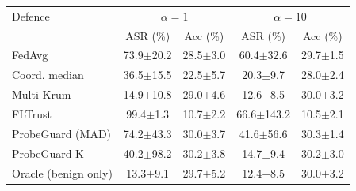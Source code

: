 \begin{tabular}{@{}lcccc@{}}
\toprule
Defence & \multicolumn{2}{c}{$\alpha=1$} & \multicolumn{2}{c}{$\alpha=10$}\\
 & ASR (\%) & Acc (\%) & ASR (\%) & Acc (\%)\\
\midrule
FedAvg & 73.9$\pm$20.2 & 28.5$\pm$3.0 & 60.4$\pm$32.6 & 29.7$\pm$1.5\\
Coord. median & 36.5$\pm$15.5 & 22.5$\pm$5.7 & 20.3$\pm$9.7 & 28.0$\pm$2.4\\
Multi-Krum & 14.9$\pm$10.8 & 29.0$\pm$4.6 & 12.6$\pm$8.5 & 30.0$\pm$3.2\\
FLTrust & 99.4$\pm$1.3 & 10.7$\pm$2.2 & 66.6$\pm$143.2 & 10.5$\pm$2.1\\
ProbeGuard (MAD) & 74.2$\pm$43.3 & 30.0$\pm$3.7 & 41.6$\pm$56.6 & 30.3$\pm$1.4\\
ProbeGuard-K & 40.2$\pm$98.2 & 30.2$\pm$3.8 & 14.7$\pm$9.4 & 30.2$\pm$3.0\\
Oracle (benign only) & 13.3$\pm$9.1 & 29.7$\pm$5.2 & 12.4$\pm$8.5 & 30.0$\pm$3.2\\
\bottomrule
\end{tabular}